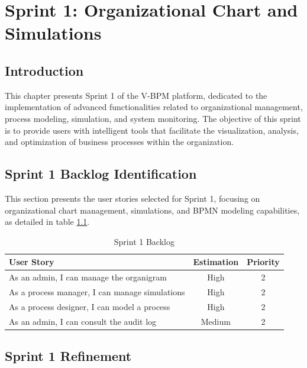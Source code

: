 \chapter{Sprint 1: Organizational Chart and Simulations}

\section{Introduction}

This chapter presents Sprint 1 of the V-BPM platform, dedicated to the implementation of advanced functionalities related to organizational management, process modeling, simulation, and system monitoring. The objective of this sprint is to provide users with intelligent tools that facilitate the visualization, analysis, and optimization of business processes within the organization. 

\section{Sprint 1 Backlog Identification}

This section presents the user stories selected for Sprint 1, focusing on organizational chart management, simulations, and BPMN modeling capabilities, as detailed in table \ref{tab:backlog-sprint1}.

\begin{table}[H]
\centering
\caption{Sprint 1 Backlog}
\label{tab:backlog-sprint1}
\begin{tabular}{|p{8cm}|c|c|}
\hline
\textbf{User Story} & \textbf{Estimation} & \textbf{Priority} \\
\hline
As an admin, I can manage the organigram & High & 2 \\
\hline
As a process manager, I can manage simulations & High & 2 \\
\hline
As a process designer, I can model a process & High & 2 \\
\hline
As an admin, I can consult the audit log & Medium & 2 \\
\hline
\end{tabular}
\end{table}

\section{Sprint 1 Refinement}

